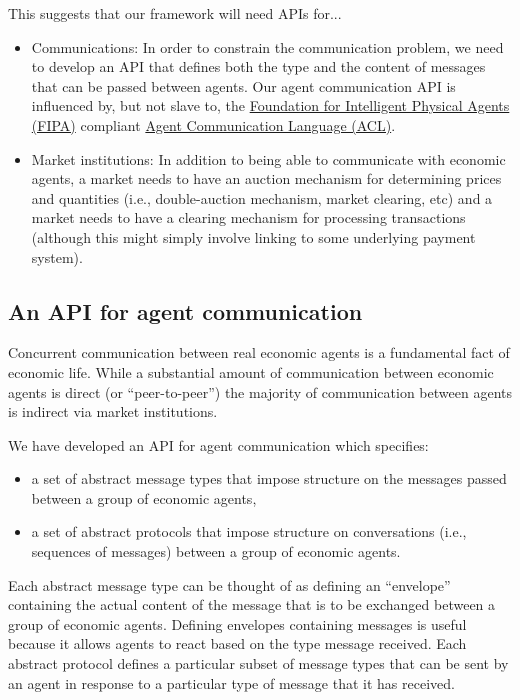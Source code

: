 \documentclass[11pt]{amsart}
\begin{document}
This suggests that our framework will need APIs for...
\begin{itemize}
    \item Communications: In order to constrain the communication problem, we need to develop an API that defines both the type and the content of messages that can be passed between agents. Our agent communication API is influenced by, but not slave to, the \href{http://www.fipa.org/}{Foundation for Intelligent Physical Agents (FIPA)} compliant \href{http://www.fipa.org/specs/fipa00037/SC00037J.pdf}{Agent Communication Language (ACL)}. 
    \item Market institutions: In addition to being able to communicate with economic agents, a market needs to have an auction mechanism for determining prices and quantities (i.e., double-auction mechanism, market clearing, etc) and a market needs to have a clearing mechanism for processing transactions (although this might simply involve linking to some underlying payment system).
\end{itemize}

\subsection{An API for agent communication}
Concurrent communication between real economic agents is a fundamental fact of economic life. While a substantial amount of communication between economic agents is direct (or ``peer-to-peer'') the majority of communication between agents is indirect via market institutions.  

We have developed an API for agent communication which specifies:
\begin{itemize}
    \item a set of abstract message types that impose structure on the messages passed between a group of economic agents,
    \item a set of abstract protocols that impose structure on conversations (i.e., sequences of messages) between a group of economic agents. 
\end{itemize}
Each abstract message type can be thought of as defining an ``envelope'' containing the actual content of the message that is to be exchanged between a group of economic agents. Defining envelopes containing messages is useful because it allows agents to react based on the type message received. Each abstract protocol defines a particular subset of message types that can be sent by an agent in response to a particular type of message that it has received. 
\end{document}
